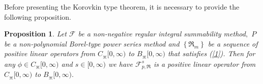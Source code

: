 \documentclass{amsart}
\theoremstyle{plain}
\newtheorem{proposition}{Proposition}
\numberwithin{equation}{section}
\begin{document}
Before presenting the Korovkin type theorem, it is necessary to provide the
following proposition.

\begin{proposition}
Let $\mathcal{F}$ be a non-negative regular integral summability method$,$ $P$
be a non-polynomial Borel-type power series method and $\left \{  \Re
_{m}\right \}  $ be a sequence of positive linear operators from
$C_{\divideontimes}[0,\infty)$ to $B_{\divideontimes}[0,\infty)$ that
satisfies (\ref{1}). Then for any $\phi \in C_{\divideontimes}[0,\infty)$ and
$s\in \mathbb{[}0,\infty \mathbb{)}$ we have $%
\mathcal{F}%
_{p,\Re}^{s}$ is a positive linear operator from $C_{\divideontimes}%
[0,\infty)$ to $B_{\divideontimes}[0,\infty).$
\end{proposition}
\end{document}
